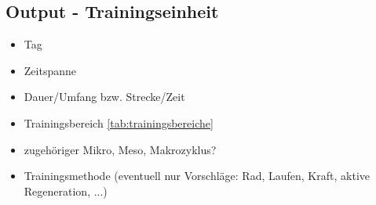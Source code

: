 \subsection{Output - Trainingseinheit}
\label{sec:modellierung:output}
    \begin{itemize}
        \item Tag
        \item Zeitspanne
        \item Dauer/Umfang bzw. Strecke/Zeit 
        \item Trainingsbereich \ref{tab:trainingsbereiche}
        \item zugehöriger Mikro, Meso, Makrozyklus?
        \item Trainingsmethode (eventuell nur Vorschläge: Rad, Laufen, Kraft, aktive Regeneration, ...)
    \end{itemize}